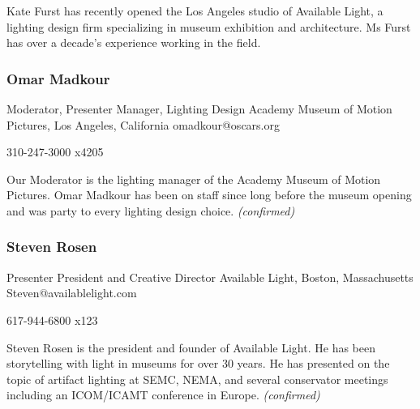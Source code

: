 \documentclass{report}
\begin{document}
              Kate Furst has recently opened the Los Angeles studio of Available Light, a lighting design firm specializing in museum exhibition and architecture. Ms Furst has over a decade’s experience working in the field.\newline


              
                \subsubsection*{ Omar Madkour }
                Moderator, Presenter\newline
                Manager, Lighting Design\newline
                Academy Museum of Motion Pictures, Los Angeles, California
                \newline
                omadkour@oscars.org\newline
                
                310-247-3000 x4205\newline

                Our Moderator is the lighting manager of the Academy Museum of Motion Pictures. Omar Madkour has been on staff since long before the museum opening and was party to every lighting design choice.\newline
                \emph{ (confirmed) }
              

              
                \subsubsection*{ Steven Rosen }
                Presenter\newline
                President and Creative Director\newline
                Available Light, Boston, Massachusetts
                \newline
                Steven@availablelight.com\newline
                
                617-944-6800 x123\newline

                Steven Rosen is the president and founder of Available Light. He has been storytelling with light in museums for over 30 years. He has presented on the topic of artifact lighting at SEMC, NEMA, and several conservator meetings including an ICOM/ICAMT conference in Europe.
                \emph{ (confirmed) }
              
\end{document}
